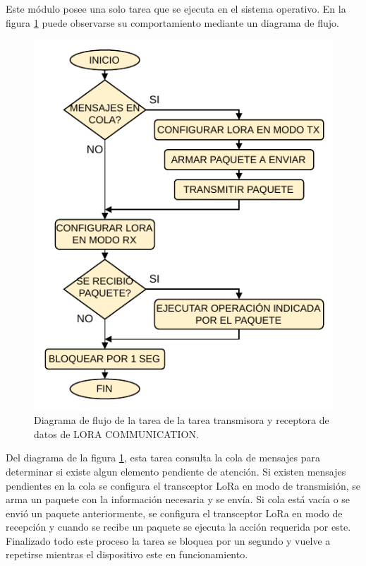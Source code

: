 Este módulo posee una solo tarea que se ejecuta en el sistema operativo. En la figura \ref{fig:loraTask} puede observarse su comportamiento mediante un diagrama de flujo.

\begin{figure}[h]
	\centering
	\includegraphics[scale=1]{./Figures/lora_communication_task.pdf}
	\caption{Diagrama de flujo de la tarea de la tarea transmisora y receptora de datos de LORA COMMUNICATION.}
		\label{fig:loraTask}
\end{figure}

Del diagrama de la figura \ref{fig:loraTask}, esta tarea consulta la cola de mensajes para determinar si existe algun elemento pendiente de atención. Si existen mensajes pendientes en la cola se configura el transceptor LoRa en modo de transmisión, se arma un paquete con la información necesaria y se envía. Si cola está vacía o se envió un paquete anteriormente, se configura el transceptor LoRa en modo de recepción y cuando se recibe un paquete se ejecuta la acción requerida por este. Finalizado todo este proceso la tarea se bloquea por un segundo y vuelve a repetirse mientras el dispositivo este en funcionamiento.

